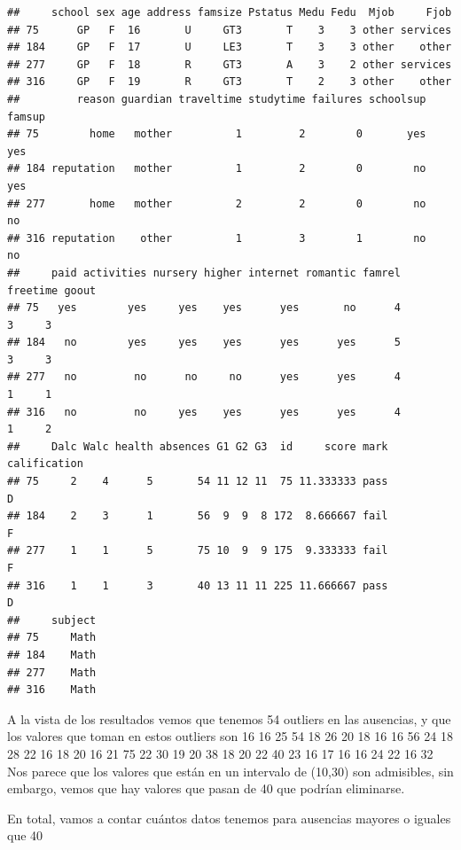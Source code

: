 \documentclass[]{article}
\newenvironment{Shaded}{\begin{snugshade}}{\end{snugshade}}
\newcommand{\DecValTok}[1]{\textcolor[rgb]{0.86,0.86,0.80}{#1}}
\newcommand{\NormalTok}[1]{\textcolor[rgb]{0.80,0.80,0.80}{#1}}
\newcommand{\OperatorTok}[1]{\textcolor[rgb]{0.94,0.94,0.82}{#1}}
\begin{document}
\begin{verbatim}
##     school sex age address famsize Pstatus Medu Fedu  Mjob     Fjob
## 75      GP   F  16       U     GT3       T    3    3 other services
## 184     GP   F  17       U     LE3       T    3    3 other    other
## 277     GP   F  18       R     GT3       A    3    2 other services
## 316     GP   F  19       R     GT3       T    2    3 other    other
##         reason guardian traveltime studytime failures schoolsup famsup
## 75        home   mother          1         2        0       yes    yes
## 184 reputation   mother          1         2        0        no    yes
## 277       home   mother          2         2        0        no     no
## 316 reputation    other          1         3        1        no     no
##     paid activities nursery higher internet romantic famrel freetime goout
## 75   yes        yes     yes    yes      yes       no      4        3     3
## 184   no        yes     yes    yes      yes      yes      5        3     3
## 277   no         no      no     no      yes      yes      4        1     1
## 316   no         no     yes    yes      yes      yes      4        1     2
##     Dalc Walc health absences G1 G2 G3  id     score mark calification
## 75     2    4      5       54 11 12 11  75 11.333333 pass            D
## 184    2    3      1       56  9  9  8 172  8.666667 fail            F
## 277    1    1      5       75 10  9  9 175  9.333333 fail            F
## 316    1    1      3       40 13 11 11 225 11.666667 pass            D
##     subject
## 75     Math
## 184    Math
## 277    Math
## 316    Math
\end{verbatim}

A la vista de los resultados vemos que tenemos 54 outliers en las
ausencias, y que los valores que toman en estos outliers son 16 16 25 54
18 26 20 18 16 16 56 24 18 28 22 16 18 20 16 21 75 22 30 19 20 38 18 20
22 40 23 16 17 16 16 24 22 16 32 Nos parece que los valores que están en
un intervalo de (10,30) son admisibles, sin embargo, vemos que hay
valores que pasan de 40 que podrían eliminarse.

En total, vamos a contar cuántos datos tenemos para ausencias mayores o
iguales que 40

\begin{Shaded}
\end{Shaded}
\end{document}
